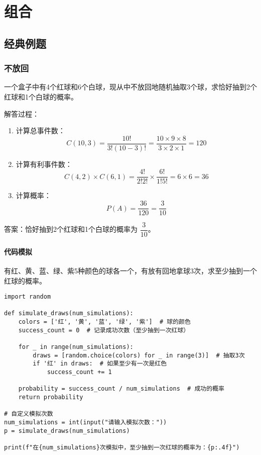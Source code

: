 \documentclass[a4paper]{ctexbook}
\begin{document}
\chapter{组合}

\section{经典例题}

\subsection*{不放回}

一个盒子中有4个红球和6个白球，现从中不放回地随机抽取3个球，求恰好抽到2个红球和1个白球的概率。

解答过程：

\begin{enumerate}
\item 
计算总事件数：
\[
C(10,3) = \frac{10!}{3!(10-3)!} = \frac{10 \times 9 \times 8}{3 \times 2 \times 1} = 120
\]

\item 
计算有利事件数：
\[
C(4,2) \times C(6,1) = \frac{4!}{2!2!} \times \frac{6!}{1!5!} = 6 \times 6 = 36
\]

\item 
计算概率：
\[
P(A) = \frac{36}{120} = \frac{3}{10}
\]
\end{enumerate}

答案：恰好抽到2个红球和1个白球的概率为 \(\boxed{\dfrac{3}{10}}\)。

\subsubsection*{代码模拟}

有红、黄、蓝、绿、紫5种颜色的球各一个，有放有回地拿球3次，求至少抽到一个红球的概率。

\begin{verbatim}
import random

def simulate_draws(num_simulations):
    colors = ['红', '黄', '蓝', '绿', '紫']  # 球的颜色
    success_count = 0  # 记录成功次数（至少抽到一次红球）

    for _ in range(num_simulations):
        draws = [random.choice(colors) for _ in range(3)]  # 抽取3次
        if '红' in draws:  # 如果至少有一次是红色
            success_count += 1

    probability = success_count / num_simulations  # 成功的概率
    return probability

# 自定义模拟次数
num_simulations = int(input("请输入模拟次数："))
p = simulate_draws(num_simulations)

print(f"在{num_simulations}次模拟中，至少抽到一次红球的概率为：{p:.4f}")
\end{verbatim}
\end{document}
